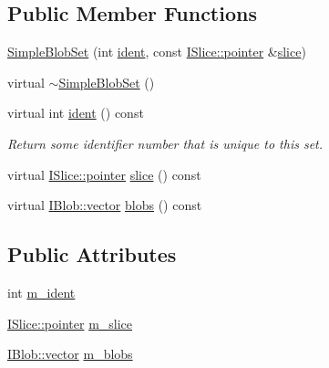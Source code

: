 \subsection*{Public Member Functions}
\begin{DoxyCompactItemize}
\item 
\hyperlink{class_wire_cell_1_1_simple_blob_set_a5ec82acf45228fe08c9e0535a06cd6fb}{Simple\+Blob\+Set} (int \hyperlink{class_wire_cell_1_1_simple_blob_set_ad3ac749afa97671793e1c16e390c3534}{ident}, const \hyperlink{class_wire_cell_1_1_i_data_aff870b3ae8333cf9265941eef62498bc}{I\+Slice\+::pointer} \&\hyperlink{class_wire_cell_1_1_simple_blob_set_a72e71d9df512fe2efe1d3e8c5a1f7087}{slice})
\item 
virtual \hyperlink{class_wire_cell_1_1_simple_blob_set_a8b579ecc8da7c59bac25fbfa4e2cd8b5}{$\sim$\+Simple\+Blob\+Set} ()
\item 
virtual int \hyperlink{class_wire_cell_1_1_simple_blob_set_ad3ac749afa97671793e1c16e390c3534}{ident} () const
\begin{DoxyCompactList}\small\item\em Return some identifier number that is unique to this set. \end{DoxyCompactList}\item 
virtual \hyperlink{class_wire_cell_1_1_i_data_aff870b3ae8333cf9265941eef62498bc}{I\+Slice\+::pointer} \hyperlink{class_wire_cell_1_1_simple_blob_set_a72e71d9df512fe2efe1d3e8c5a1f7087}{slice} () const
\item 
virtual \hyperlink{class_wire_cell_1_1_i_data_ae1a9f863380499bb43f39fabb6276660}{I\+Blob\+::vector} \hyperlink{class_wire_cell_1_1_simple_blob_set_abee0b145a6a64ebc44fc37e05191188a}{blobs} () const
\end{DoxyCompactItemize}
\subsection*{Public Attributes}
\begin{DoxyCompactItemize}
\item 
int \hyperlink{class_wire_cell_1_1_simple_blob_set_a0731cc2bfcfba2e445c5c540a81225fb}{m\+\_\+ident}
\item 
\hyperlink{class_wire_cell_1_1_i_data_aff870b3ae8333cf9265941eef62498bc}{I\+Slice\+::pointer} \hyperlink{class_wire_cell_1_1_simple_blob_set_a6514d9bd10ebf666b072d2e21cd830bc}{m\+\_\+slice}
\item 
\hyperlink{class_wire_cell_1_1_i_data_ae1a9f863380499bb43f39fabb6276660}{I\+Blob\+::vector} \hyperlink{class_wire_cell_1_1_simple_blob_set_a31c6a0d3c353db05e2c858cf0e66a59a}{m\+\_\+blobs}
\end{DoxyCompactItemize}
